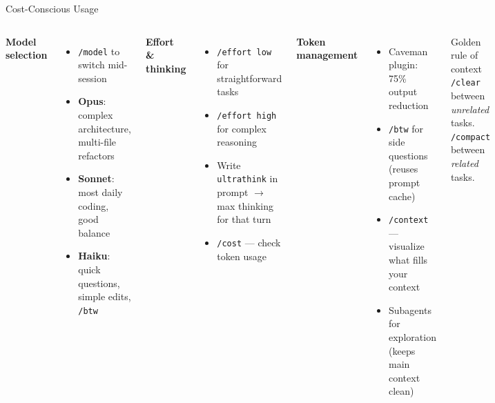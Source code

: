 \documentclass[aspectratio=169]{beamer}
\begin{document}
\begin{frame}{Cost-Conscious Usage}
\begin{columns}[T]
\textbf{\color{popblue}Model selection}
\begin{itemize}
  \item \texttt{/model} to switch mid-session
  \item \textbf{Opus}: complex architecture, multi-file refactors
  \item \textbf{Sonnet}: most daily coding, good balance
  \item \textbf{Haiku}: quick questions, simple edits, \texttt{/btw}
\end{itemize}

\bigskip
\textbf{\color{paramgreen}Effort \& thinking}
\begin{itemize}
  \item \texttt{/effort low} for straightforward tasks
  \item \texttt{/effort high} for complex reasoning
  \item Write \texttt{ultrathink} in prompt $\to$ max thinking for that turn
  \item \texttt{/cost} --- check token usage
\end{itemize}

\textbf{\color{orange1}Token management}
\begin{itemize}
  \item Caveman plugin: 75\% output reduction
  \item \texttt{/btw} for side questions (reuses prompt cache)
  \item \texttt{/context} --- visualize what fills your context
  \item Subagents for exploration (keeps main context clean)
\end{itemize}

\bigskip
\begin{alertblock}{Golden rule of context}
\texttt{/clear} between \emph{unrelated} tasks. \\
\texttt{/compact} between \emph{related} tasks.
\end{alertblock}
\end{columns}
\end{frame}
\end{document}
